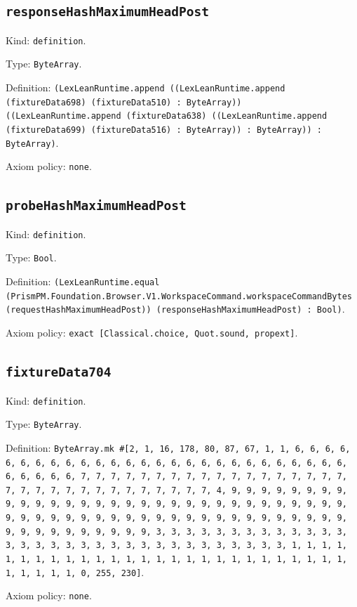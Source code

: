\documentclass[11pt]{article}
\begin{document}
\subsection*{\texttt{responseHashMaximumHeadPost}}
\noindent Kind: \texttt{definition}.\par
\noindent Type: \texttt{ByteArray}.\par
\noindent Definition: \texttt{(LexLeanRuntime.append ((LexLeanRuntime.append (fixtureData698) (fixtureData510) : ByteArray)) ((LexLeanRuntime.append (fixtureData638) ((LexLeanRuntime.append (fixtureData699) (fixtureData516) : ByteArray)) : ByteArray)) : ByteArray)}.\par
\noindent Axiom policy: \texttt{none}.\par
\subsection*{\texttt{probeHashMaximumHeadPost}}
\noindent Kind: \texttt{definition}.\par
\noindent Type: \texttt{Bool}.\par
\noindent Definition: \texttt{(LexLeanRuntime.equal (PrismPM.Foundation.Browser.V1.WorkspaceCommand.workspaceCommandBytes (requestHashMaximumHeadPost)) (responseHashMaximumHeadPost) : Bool)}.\par
\noindent Axiom policy: \texttt{exact [Classical.choice, Quot.sound, propext]}.\par
\subsection*{\texttt{fixtureData704}}
\noindent Kind: \texttt{definition}.\par
\noindent Type: \texttt{ByteArray}.\par
\noindent Definition: \texttt{ByteArray.mk \#[2, 1, 16, 178, 80, 87, 67, 1, 1, 6, 6, 6, 6, 6, 6, 6, 6, 6, 6, 6, 6, 6, 6, 6, 6, 6, 6, 6, 6, 6, 6, 6, 6, 6, 6, 6, 6, 6, 6, 6, 6, 7, 7, 7, 7, 7, 7, 7, 7, 7, 7, 7, 7, 7, 7, 7, 7, 7, 7, 7, 7, 7, 7, 7, 7, 7, 7, 7, 7, 7, 7, 7, 7, 4, 9, 9, 9, 9, 9, 9, 9, 9, 9, 9, 9, 9, 9, 9, 9, 9, 9, 9, 9, 9, 9, 9, 9, 9, 9, 9, 9, 9, 9, 9, 9, 9, 9, 9, 9, 9, 9, 9, 9, 9, 9, 9, 9, 9, 9, 9, 9, 9, 9, 9, 9, 9, 9, 9, 9, 9, 9, 9, 9, 9, 9, 9, 9, 9, 3, 3, 3, 3, 3, 3, 3, 3, 3, 3, 3, 3, 3, 3, 3, 3, 3, 3, 3, 3, 3, 3, 3, 3, 3, 3, 3, 3, 3, 3, 3, 3, 1, 1, 1, 1, 1, 1, 1, 1, 1, 1, 1, 1, 1, 1, 1, 1, 1, 1, 1, 1, 1, 1, 1, 1, 1, 1, 1, 1, 1, 1, 1, 1, 0, 255, 230]}.\par
\noindent Axiom policy: \texttt{none}.\par
\end{document}
